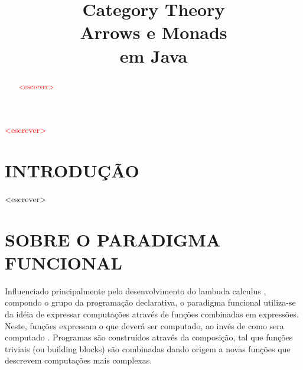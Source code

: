 \documentclass[10pt, conference]{IEEEtran}
\begin{document}
\title { 
	Category Theory \\
	Arrows e Monads \\
	em Java 
}

\author{


	\and	
	
}
					  
\maketitle

\begin{abstract}

\textcolor{red}{<escrever>}

\end{abstract}

\begin{IEEEkeywords}

\textcolor{red}{<escrever>}

\end{IEEEkeywords}

\section{INTRODUÇÃO}
\label{sec:intro}

<escrever>

\section{SOBRE O PARADIGMA FUNCIONAL}
\label{sec:func-para}
Influenciado principalmente pelo desenvolvimento do lambuda calculus \cite{hudak1989conception}, compondo o grupo da programação declarativa, o paradigma funcional utiliza-se da idéia de expressar computações através de funções combinadas em expressões. Neste, funções expressam o que deverá ser computado, ao invés de como sera computado \cite{louden2011programming}. Programas são construídos através da composição, tal que funções triviais (ou building blocks) são combinadas dando origem a novas funções que descrevem computações mais complexas.
\end{document}
